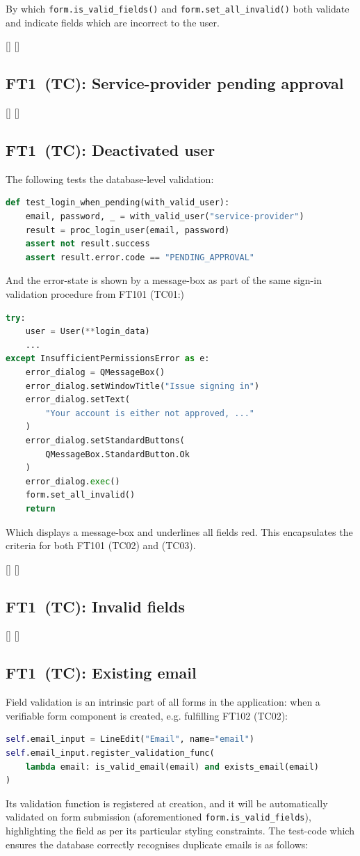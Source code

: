 \documentclass[journal]{IEEEtran}
\newcommand{\testcase}[4]{%
	\StrRight{00#2}{2}[\paddedminor]%
	\StrRight{00#3}{2}[\paddedid]%
	\vspace{-.5em}%
	\subsection*{\textsc{FT#1\paddedminor~(TC\paddedid):} #4}%
}
\begin{document}
	By which \lstinline[language=Python]|form.is_valid_fields()| and \lstinline[language=Python]|form.set_all_invalid()| both validate and indicate fields which are incorrect to the user.
	
	\testcase{1}{1}{2}{Service-provider pending approval}
	\testcase{1}{1}{3}{Deactivated user}
	The following tests the database-level validation:
	
	\begin{lstlisting}[language=Python]
def test_login_when_pending(with_valid_user):
	email, password, _ = with_valid_user("service-provider")
	result = proc_login_user(email, password)
	assert not result.success
	assert result.error.code == "PENDING_APPROVAL"
	\end{lstlisting}
	
	And the error-state is shown by a message-box as part of the same sign-in validation procedure from FT101 (TC01:)
	
	\begin{lstlisting}[language=Python]
try:
	user = User(**login_data)
	...
except InsufficientPermissionsError as e:
	error_dialog = QMessageBox()
	error_dialog.setWindowTitle("Issue signing in")
	error_dialog.setText(
		"Your account is either not approved, ..."
	)
	error_dialog.setStandardButtons(
		QMessageBox.StandardButton.Ok
	)
	error_dialog.exec()
	form.set_all_invalid()
	return
	\end{lstlisting}
	
	Which displays a message-box and underlines all fields red. This encapsulates the criteria for both FT101 (TC02) and (TC03).
	
	\testcase{1}{2}{1}{Invalid fields}
	\testcase{1}{2}{2}{Existing email}
	Field validation is an intrinsic part of all forms in the application: when a verifiable form component is created, e.g. fulfilling FT102 (TC02):
	
	\begin{lstlisting}[language=Python]
self.email_input = LineEdit("Email", name="email")
self.email_input.register_validation_func(
	lambda email: is_valid_email(email) and exists_email(email)
)
	\end{lstlisting}
	
	Its validation function is registered at creation, and it will be automatically validated on form submission (aforementioned \lstinline[language=Python]|form.is_valid_fields|), highlighting the field as per its particular styling constraints. The test-code which ensures the database correctly recognises duplicate emails is as follows:
	
\end{document}
